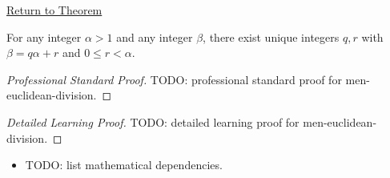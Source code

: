 \newpage
{}
\label{prf:men-euclidean-division}

\begin{remark*}[Return]
\hyperref[thm:men-euclidean-division]{Return to Theorem}
\end{remark*}

\begin{theorem*}
For any integer $\alpha>1$ and any integer $\beta$, there exist unique
integers $q,r$ with $\beta=q\alpha+r$ and $0\leq r<\alpha$.
\end{theorem*}

\begin{proof}[Professional Standard Proof]
\LRAProofBodyStart
TODO: professional standard proof for men-euclidean-division.
\end{proof}

\begin{proof}[Detailed Learning Proof]
\LRAProofBodyStart
TODO: detailed learning proof for men-euclidean-division.
\end{proof}

\begin{remark*}
\end{remark*}

\begin{dependencies}
\begin{itemize}
  \item TODO: list mathematical dependencies.
\end{itemize}
\end{dependencies}

\clearpage
